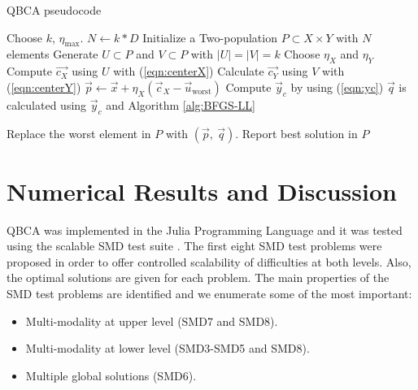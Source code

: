 \documentclass[conference]{IEEEtran}
\theoremstyle{definition}
\begin{document}
\begin{algorithm}[htbp]
    \caption{QBCA pseudocode}
    \label{alg:QBCA}
    \begin{algorithmic}[1]
        \STATE Choose $k$, $\eta_{\max}$.
        \STATE $N \gets k * D$
        \STATE Initialize a Two-population $P\subset X\times Y$ with $N$ elements
                \STATE Generate $U \subset P$ and $V \subset P$ with $|U| = |V| = k$
                \STATE Choose $\eta_{X}$ and $\eta_{Y}$
                \STATE Compute $\vec{c_X}$ using $U$ with (\ref{eqn:centerX})
                \STATE Calculate $\vec{c_Y}$ using $V$ with (\ref{eqn:centerY})
                \STATE $ \vec{p} \gets \vec{x} + \eta_{X} (\vec{c}_X - \vec{u}_{\text{worst}})$
                \STATE Compute $ \vec{y}_c $ by using (\ref{eqn:yc})
                \STATE $ \vec{q} $ is calculated using $\vec{y}_c$ and Algorithm \ref{alg:BFGS-LL}
                
                    \STATE Replace the worst element in $P$ with $(\vec{p},\ \vec{q})$.
                \ENDIF
            \ENDFOR
        \ENDWHILE
        \STATE Report best solution in $P$
    \end{algorithmic}
\end{algorithm}

\section{Numerical Results and Discussion} %
\label{sec:numerical_result}

QBCA was implemented in the Julia Programming Language \cite{bezanson2017julia}
and it was tested using the scalable SMD test suite
\cite{sinha2014test,sinha2013efficient}. The first eight SMD test problems were
proposed in order to offer controlled scalability of difficulties at both levels.
Also, the optimal solutions are given for each problem. The main properties
of the SMD test problems are identified and we enumerate some of the most important:

\begin{itemize}
    \item Multi-modality at upper level (SMD7 and SMD8).
    \item Multi-modality at lower level (SMD3-SMD5 and SMD8).
    \item Multiple global solutions (SMD6).
\end{itemize}
\end{document}
